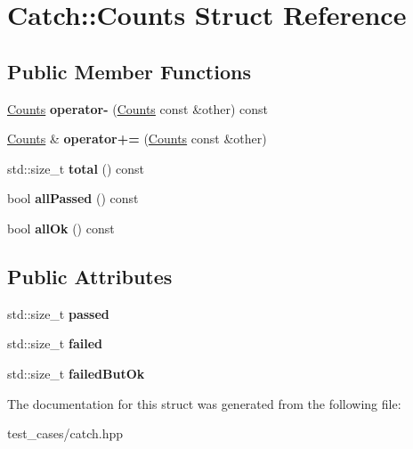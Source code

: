 \hypertarget{structCatch_1_1Counts}{}\section{Catch\+:\+:Counts Struct Reference}
\label{structCatch_1_1Counts}
\subsection*{Public Member Functions}
\begin{DoxyCompactItemize}
\item 
\mbox{\label{structCatch_1_1Counts_aaa10666f559057e3e860d2a5a6fae4c4}} 
\hyperlink{structCatch_1_1Counts}{Counts} {\bfseries operator-\/} (\hyperlink{structCatch_1_1Counts}{Counts} const \&other) const
\item 
\mbox{\label{structCatch_1_1Counts_a322a89475cd2cc039140ef371e973677}} 
\hyperlink{structCatch_1_1Counts}{Counts} \& {\bfseries operator+=} (\hyperlink{structCatch_1_1Counts}{Counts} const \&other)
\item 
\mbox{\label{structCatch_1_1Counts_a94f969c09cf52d1339c085c9603cd1d3}} 
std\+::size\+\_\+t {\bfseries total} () const
\item 
\mbox{\label{structCatch_1_1Counts_a84999490e0ecaa3de5e121bf48eda1b3}} 
bool {\bfseries all\+Passed} () const
\item 
\mbox{\label{structCatch_1_1Counts_a33bd996e016030155b99fe1c51c08991}} 
bool {\bfseries all\+Ok} () const
\end{DoxyCompactItemize}
\subsection*{Public Attributes}
\begin{DoxyCompactItemize}
\item 
\mbox{\label{structCatch_1_1Counts_ad28daaf3de28006400208b6dd0c631e6}} 
std\+::size\+\_\+t {\bfseries passed}
\item 
\mbox{\label{structCatch_1_1Counts_a19982a3817a3bc2c07f0290e71f497a3}} 
std\+::size\+\_\+t {\bfseries failed}
\item 
\mbox{\label{structCatch_1_1Counts_ac090973a2ff51394cd452718e75c073e}} 
std\+::size\+\_\+t {\bfseries failed\+But\+Ok}
\end{DoxyCompactItemize}


The documentation for this struct was generated from the following file\+:\begin{DoxyCompactItemize}
\item 
test\+\_\+cases/catch.\+hpp\end{DoxyCompactItemize}
